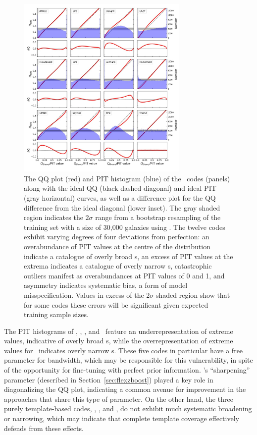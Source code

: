 \begin{figure}
\centering
\includegraphics[width=0.74\textwidth]{fig/PITANDQQplot_12codes_withsigmaband_crop.jpg}
\caption{The QQ plot (red) and PIT histogram (blue) of the \pzpdf\ codes (panels) along with the ideal QQ (black dashed diagonal) and ideal PIT (gray horizontal) curves, as well as a difference plot for the QQ difference from the ideal diagonal (lower inset).
The gray shaded region indicates the $2 \sigma$ range from a bootstrap resampling of the training set with a size of 30,000 galaxies using \trainz.
The twelve codes exhibit varying degrees of four deviations from perfection: an overabundance of PIT values at the centre of the distribution indicate a catalogue of overly broad \pzpdf s, an excess of PIT values at the extrema indicates a catalogue of overly narrow \pzpdf s, catastrophic outliers manifest as overabundances at PIT values of 0 and 1, and asymmetry indicates systematic bias, a form of model misspecification.
Values in excess of the $2\sigma$ shaded region show that for some codes these errors will be significant given expected training sample sizes.}
\label{fig:pitqq}
\end{figure}

The PIT histograms of \delight, \cmnn, \skynet, and \tpz\ feature an underrepresentation of extreme values, indicative of overly broad \pzpdf s, while the overrepresentation of extreme values for \metaphor\ indicates overly narrow \pzpdf s.
These five codes in particular have a free parameter for bandwidth, which may be responsible for this vulnerability, in spite of the opportunity for fine-tuning with perfect prior information.
\flexzboost's ``sharpening'' parameter (described in Section~\ref{sec:flexzboost}) played a key role in diagonalizing the QQ plot, indicating a common avenue for improvement in the approaches that share this type of parameter.
On the other hand, the three purely template-based codes, \bpz, \eazy, and \lephare, do not exhibit much systematic broadening or narrowing, which may indicate that complete template coverage effectively defends from these effects.

